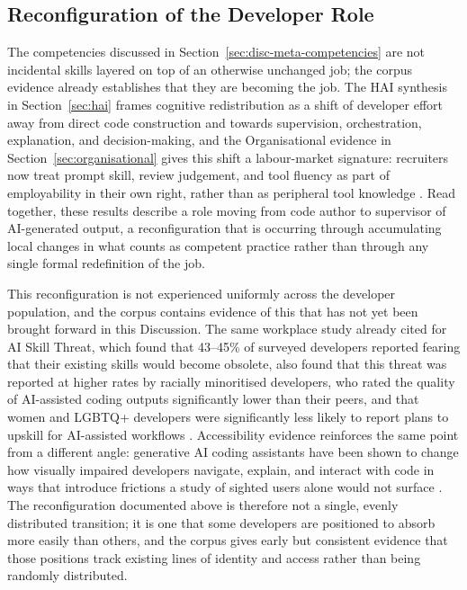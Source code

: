 \subsection{Reconfiguration of the Developer Role}
\label{sec:disc-role-reconfiguration}
The competencies discussed in Section~\ref{sec:disc-meta-competencies} are not incidental skills layered on top of an otherwise unchanged job; the corpus evidence already establishes that they are becoming the job. The HAI synthesis in Section~\ref{sec:hai} frames cognitive redistribution as a shift of developer effort away from direct code construction and towards supervision, orchestration, explanation, and decision-making, and the Organisational evidence in Section~\ref{sec:organisational} gives this shift a labour-market signature: recruiters now treat prompt skill, review judgement, and tool fluency as part of employability in their own right, rather than as peripheral tool knowledge \cite{chen_impact_2025}. Read together, these results describe a role moving from code author to supervisor of AI-generated output, a reconfiguration that is occurring through accumulating local changes in what counts as competent practice rather than through any single formal redefinition of the job.

This reconfiguration is not experienced uniformly across the developer population, and the corpus contains evidence of this that has not yet been brought forward in this Discussion. The same workplace study already cited for AI Skill Threat, which found that 43--45\% of surveyed developers reported fearing that their existing skills would become obsolete, also found that this threat was reported at higher rates by racially minoritised developers, who rated the quality of AI-assisted coding outputs significantly lower than their peers, and that women and LGBTQ+ developers were significantly less likely to report plans to upskill for AI-assisted workflows \cite{hicks_new_2024}. Accessibility evidence reinforces the same point from a different angle: generative AI coding assistants have been shown to change how visually impaired developers navigate, explain, and interact with code in ways that introduce frictions a study of sighted users alone would not surface \cite{flores-saviaga_impact_2025}. The reconfiguration documented above is therefore not a single, evenly distributed transition; it is one that some developers are positioned to absorb more easily than others, and the corpus gives early but consistent evidence that those positions track existing lines of identity and access rather than being randomly distributed.

